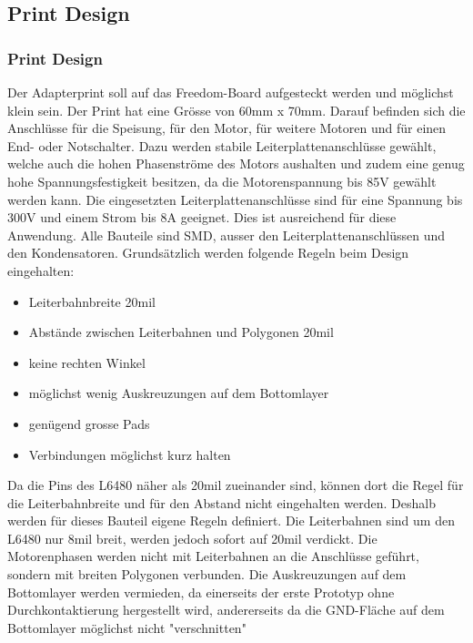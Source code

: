     \subsection{Print Design} \label{sec:PrintDesign}   
    \fi
    \ifEMBED
    \subsubsection{Print Design} \label{sec:PrintDesigna}
    \fi
    Der Adapterprint soll auf das Freedom-Board aufgesteckt werden und 
    möglichst klein sein. Der Print hat eine Grösse von 60mm x 70mm. Darauf 
    befinden sich die Anschlüsse für die Speisung, für den Motor, für weitere 
    Motoren und für einen End- oder Notschalter. Dazu werden stabile 
    Leiterplattenanschlüsse gewählt, welche auch die hohen Phasenströme des 
    Motors aushalten und zudem eine genug hohe Spannungsfestigkeit besitzen, 
    da die Motorenspannung bis 85V gewählt werden kann. Die eingesetzten 
    Leiterplattenanschlüsse sind für eine Spannung bis 300V und einem Strom 
    bis 8A geeignet. Dies ist ausreichend für diese Anwendung. Alle Bauteile 
    sind SMD, ausser den Leiterplattenanschlüssen und den Kondensatoren.
    \newpage
    Grundsätzlich werden folgende Regeln beim Design eingehalten: 
    \begin{itemize}
        \item Leiterbahnbreite 20mil
        \item Abstände zwischen Leiterbahnen und Polygonen 20mil
        \item keine rechten Winkel
        \item möglichst wenig Auskreuzungen auf dem Bottomlayer
        \item genügend grosse Pads 
        \item Verbindungen möglichst kurz halten
    \end{itemize}
    Da die Pins des L6480 näher als 20mil zueinander sind, können dort die 
    Regel für die Leiterbahnbreite und für den Abstand nicht eingehalten 
    werden. Deshalb werden für dieses Bauteil eigene Regeln definiert. Die 
    Leiterbahnen sind um den L6480 nur 8mil breit, werden jedoch sofort auf 
    20mil verdickt. Die Motorenphasen werden nicht mit Leiterbahnen an die 
    Anschlüsse geführt, sondern mit breiten Polygonen verbunden. Die 
    Auskreuzungen auf dem Bottomlayer werden vermieden, da einerseits 
    der erste Prototyp ohne Durchkontaktierung hergestellt wird, andererseits 
    da die GND-Fläche auf dem Bottomlayer möglichst nicht "verschnitten" 
